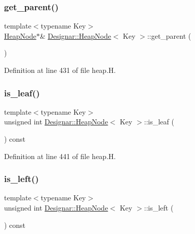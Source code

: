 \subsubsection{\texorpdfstring{get\+\_\+parent()}{get\_parent()}}
{\footnotesize\ttfamily template$<$typename Key$>$ \\
\hyperlink{class_designar_1_1_heap_node}{Heap\+Node}$\ast$\& \hyperlink{class_designar_1_1_heap_node}{Designar\+::\+Heap\+Node}$<$ Key $>$\+::get\+\_\+parent (\begin{DoxyParamCaption}{ }\end{DoxyParamCaption})\hspace{0.3cm}{\ttfamily [inline]}}



Definition at line 431 of file heap.\+H.

\mbox{\label{class_designar_1_1_heap_node_ad0b5b06b0126cdd711970709c4fb2187}} 
\subsubsection{\texorpdfstring{is\+\_\+leaf()}{is\_leaf()}}
{\footnotesize\ttfamily template$<$typename Key$>$ \\
unsigned int \hyperlink{class_designar_1_1_heap_node}{Designar\+::\+Heap\+Node}$<$ Key $>$\+::is\+\_\+leaf (\begin{DoxyParamCaption}{ }\end{DoxyParamCaption}) const\hspace{0.3cm}{\ttfamily [inline]}}



Definition at line 441 of file heap.\+H.

\mbox{\label{class_designar_1_1_heap_node_a778fa64fe1c4221eb7833cfb68713332}} 
\subsubsection{\texorpdfstring{is\+\_\+left()}{is\_left()}}
{\footnotesize\ttfamily template$<$typename Key$>$ \\
unsigned int \hyperlink{class_designar_1_1_heap_node}{Designar\+::\+Heap\+Node}$<$ Key $>$\+::is\+\_\+left (\begin{DoxyParamCaption}{ }\end{DoxyParamCaption}) const\hspace{0.3cm}{\ttfamily [inline]}}



